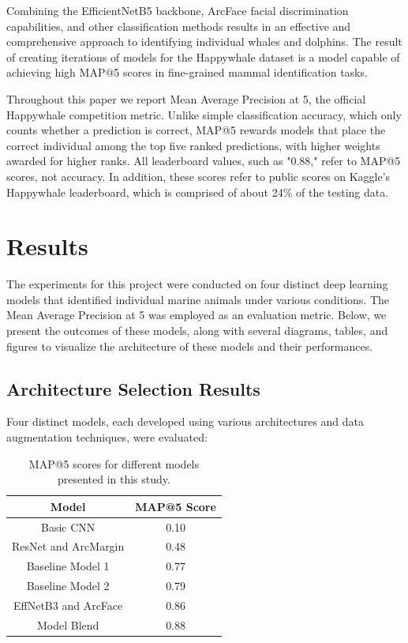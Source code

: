 \documentclass[twocolumn]{article}
\begin{document}
Combining the EfficientNetB5 backbone, ArcFace facial discrimination capabilities, and other classification methods results in an effective and comprehensive approach to identifying individual whales and dolphins. The result of creating iterations of models for the Happywhale dataset is a model capable of achieving high MAP@5 scores in fine-grained mammal identification tasks.

Throughout this paper we report Mean Average Precision at 5, the official Happywhale competition metric. Unlike simple classification accuracy, which only counts whether a prediction is correct, MAP@5 rewards models that place the correct individual among the top five ranked predictions, with higher weights awarded for higher ranks. All leaderboard values, such as "0.88," refer to MAP@5 scores, not accuracy. In addition, these scores refer to public scores on Kaggle's Happywhale leaderboard, which is comprised of about 24\% of the testing data.

\section{Results}

The experiments for this project were conducted on four distinct deep learning models that identified individual marine animals under various conditions. The Mean Average Precision at 5 was employed as an evaluation metric. Below, we present the outcomes of these models, along with several diagrams, tables, and figures to visualize the architecture of these models and their performances.

\subsection{Architecture Selection Results}

Four distinct models, each developed using various architectures and data augmentation techniques, were evaluated:

\begin{table}[ht!]
\centering
\begin{tabular}{|c|c|}
\hline
\textbf{Model} & \textbf{MAP@5 Score}\\ 
\hline
Basic CNN & 0.10 \\ 
\hline
ResNet and ArcMargin & 0.48 \\ 
\hline
Baseline Model 1 & 0.77 \\
\hline
Baseline Model 2 & 0.79 \\
\hline
EffNetB3 and ArcFace& 0.86 \\ 
\hline
Model Blend & 0.88 \\ 
\hline
\end{tabular}
\caption{MAP@5 scores for different models presented in this study.}
\label{tab:model_scores}
\end{table}
\end{document}
